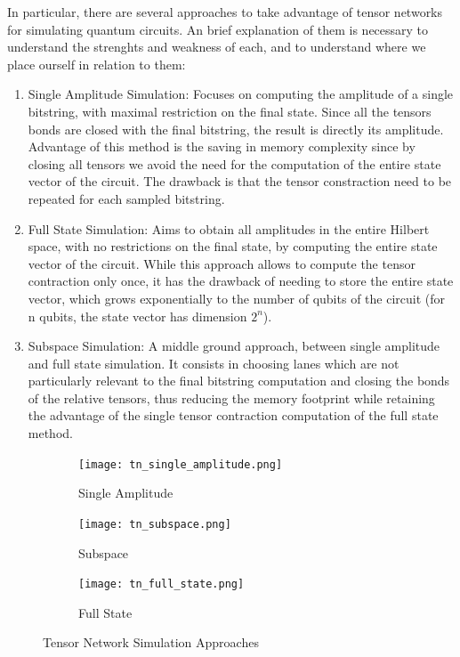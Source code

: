 \documentclass[12pt,oneside,a4paper]{article}
\begin{document}
In particular, there are several approaches to take advantage of tensor networks for simulating quantum circuits. An brief explanation of them is necessary to understand the strenghts and weakness of each, and to understand where we place ourself in relation to them:
\begin{enumerate}
    \item Single Amplitude Simulation: Focuses on computing the amplitude of a single bitstring, with maximal restriction on the final state. Since all the tensors bonds are closed with the final bitstring, the result is directly its amplitude. Advantage of this method is the saving in memory complexity since by closing all tensors we avoid the need for the computation of the entire state vector of the circuit. The drawback is that the tensor constraction need to be repeated for each sampled bitstring.
    \item Full State Simulation: Aims to obtain all amplitudes in the entire Hilbert space, with no restrictions on the final state, by computing the entire state vector of the circuit. While this approach allows to compute the tensor contraction only once, it has the drawback of needing to store the entire state vector, which grows exponentially to the number of qubits of the circuit (for n qubits, the state vector has dimension $2^n$).
    \item Subspace Simulation: A middle ground approach, between single amplitude and full state simulation. It consists in choosing lanes which are not particularly relevant to the final bitstring computation and closing the bonds of the relative tensors, thus reducing the memory footprint while retaining the advantage of the single tensor contraction computation of the full state method.
\end{enumerate}

\newpage

\begin{figure}[h]
    \centering
    \begin{subfigure}[b]{0.3\textwidth}
    \texttt{[image: tn\_single\_amplitude.png]}
    \caption{Single Amplitude\footnotemark[1]}
    \end{subfigure}
    \hfill
    \begin{subfigure}[b]{0.3\textwidth}
    \texttt{[image: tn\_subspace.png]}
    \caption{Subspace\footnotemark[3]}
    \end{subfigure}
    \hfill
    \begin{subfigure}[b]{0.3\textwidth}
    \texttt{[image: tn\_full\_state.png]}
    \caption{Full State\footnotemark[2]}
    \end{subfigure}
    \caption{Tensor Network Simulation Approaches}
\end{figure}
\end{document}
